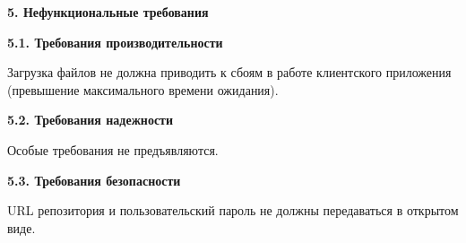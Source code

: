 \documentclass[a4paper,12pt]{article}
\begin{document}
\maketitle
\newpage
\textbf{5. Нефункциональные требования}
\newline

	\textbf{5.1.	Требования производительности}
	
		Загрузка файлов не должна приводить к сбоям в работе клиентского приложения (превышение максимального времени ожидания).
		\newline
		
	\textbf{5.2.	Требования надежности}
	
		Особые требования не предъявляются.
	\newline
	
	\textbf{5.3.	Требования безопасности}
	
		URL репозитория и пользовательский пароль не должны передаваться в открытом виде.
	\newline
\end{document}

